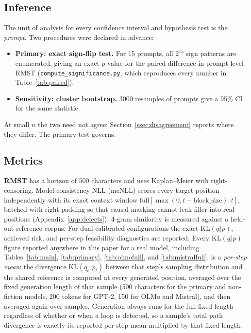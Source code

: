 \documentclass[make,article,submit,pdftex]{Definitions/mdpi}
\providecommand{\KL}{}\renewcommand{\KL}{\mathrm{KL}}
\begin{document}
\subsection{Inference}
\label{ssec:inference}
The unit of analysis for every confidence interval and hypothesis test is the \emph{prompt}. Two procedures were declared in advance:
\begin{itemize}[leftmargin=*]
  \item \textbf{Primary: exact sign-flip test.} For 15 prompts, all $2^{15}$ sign patterns are enumerated, giving an exact $p$-value for the paired difference in prompt-level RMST (\texttt{compute\_\allowbreak{}significance.py}, which reproduces every number in Table~\ref{tab:paired}).
  \item \textbf{Sensitivity: cluster bootstrap.} 3000 resamples of prompts give a 95\% CI for the same statistic.
\end{itemize}
At small $n$ the two need not agree; Section~\ref{ssec:disagreement} reports where they differ. The primary test governs.

\subsection{Metrics}
\textbf{RMST} has a horizon of 500 characters and uses Kaplan--Meier with right-censoring. Model-consistency NLL (mcNLL) scores every target position independently with its exact context window $\text{full}[\max(0,t{-}\text{block\_size}):t]$, batched with right-padding so that causal masking cannot leak filler into real positions (Appendix~\ref{app:defects}). 4-gram similarity is measured against a held-out reference corpus. For dual-calibrated configurations the exact $\KL(q\Vert p)$, achieved risk, and per-step feasibility diagnostics are reported. Every $\KL(q\Vert p)$ figure reported anywhere in this paper for a real model, including Tables~\ref{tab:main}, \ref{tab:primary}, \ref{tab:olmofull}, and \ref{tab:mistralfull}, is a \emph{per-step mean}: the divergence $\KL(q_t\Vert p_t)$ between that step's sampling distribution and the shared reference is computed at every generated position, averaged over the fixed generation length of that sample (500 characters for the primary and non-fiction models, 200 tokens for GPT-2, 150 for OLMo and Mistral), and then averaged again over samples. Generation always runs for the full fixed length regardless of whether or when a loop is detected, so a sample's total path divergence is exactly its reported per-step mean multiplied by that fixed length.
\end{document}
